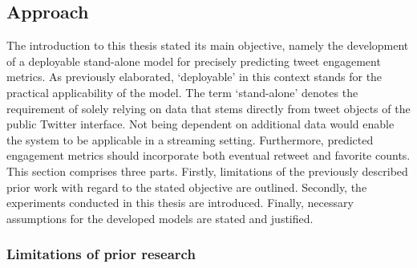 \subsection{Approach}
\label{sec:approach}

The introduction to this thesis stated its main objective, namely the
development of a deployable stand-alone model for precisely predicting tweet
engagement metrics.
As previously elaborated, `deployable' in this context stands for the practical
applicability of the model.
The term `stand-alone' denotes the requirement of solely relying
on data that stems directly from tweet objects of the public Twitter interface.
Not being dependent on additional data would enable the system to be applicable
in a streaming setting.
Furthermore, predicted engagement metrics should incorporate both eventual
retweet and favorite counts.
This section comprises three parts.
Firstly, limitations of the previously described prior work with regard to the
stated objective are outlined.
Secondly, the experiments conducted in this thesis are introduced.
Finally, necessary assumptions for the developed models are stated and justified.

\subsubsection{Limitations of prior research}

